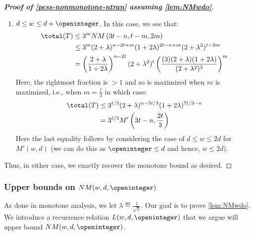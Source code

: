 \begin{proof}[\textbf{Proof of \cref{pess-nonmonotone-ntran} assuming \cref{lem:NMwdo}}]
\begin{enumerate}[label=\textbf{Case \arabic*:}, itemindent=*, leftmargin=0em]
\item $d\le w\le d + \openinteger$.
In this case, we see that:
\begin{align*}
\total(T)
& \le 3^m NM\left(3t-n, t - m, 2m\right)\\
& \le 3^m (2+\lambda)^{n-2t+m}(1+2\lambda)^{2t-n+m}(2+\lambda^2)^{t-3m}\\
& = \left(\frac{2+\lambda}{1+2\lambda}\right)^{n-2t}(2+\lambda^2)^t\left(\frac{(3)(2+\lambda)(1+2\lambda)}{(2+\lambda^2)^3}\right)^m\\
\end{align*}
Here, the rightmost fraction is $> 1$ and so is maximized when $m$ is maximized, i.e., when $m = \frac{t}{3}$ in which case:
\begin{align*}
\total(T)
& \le 3^{t/3} (2+\lambda)^{n - 5t/3} (1+2\lambda)^{7t/3 - n}\\
& = 3^{t/3} M'\left(3t-n, \frac{2t}{3}\right)
\end{align*}
Here the last equality follows by considering the case of $d\le w\le 2d$ for $M'(w, d)$ (we can do this as $\openinteger \le d$ and hence, $w\le 2d$).
\end{enumerate}

Thus, in either case, we exactly recover the monotone bound as desired.
\end{proof}








\subsubsection{Upper bounds on $NM(w, d, \openinteger)$}

As done in monotone analysis, we let $\lambda \eqdef \frac{1}{\sqrt{3}}$. 
Our goal is to prove \cref{lem:NMwdo}.
We introduce a recurrence relation $L(w, d, \openinteger)$ that we argue will upper bound $NM(w, d, \openinteger)$.

